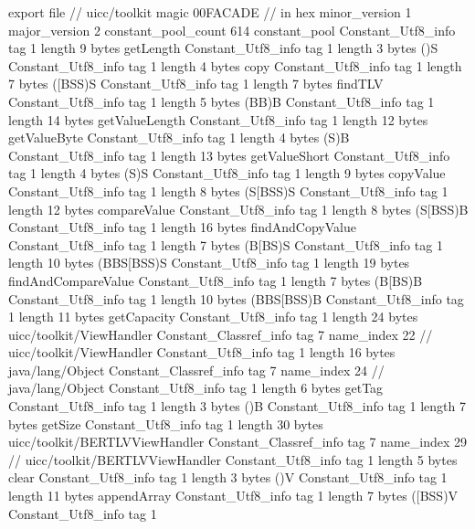 export file {		// uicc/toolkit
	magic	00FACADE		 // in hex
	minor_version	1
	major_version	2
	constant_pool_count	614
	constant_pool {
		Constant_Utf8_info {
			tag	1
			length	9
			bytes	getLength
		}
		Constant_Utf8_info {
			tag	1
			length	3
			bytes	()S
		}
		Constant_Utf8_info {
			tag	1
			length	4
			bytes	copy
		}
		Constant_Utf8_info {
			tag	1
			length	7
			bytes	([BSS)S
		}
		Constant_Utf8_info {
			tag	1
			length	7
			bytes	findTLV
		}
		Constant_Utf8_info {
			tag	1
			length	5
			bytes	(BB)B
		}
		Constant_Utf8_info {
			tag	1
			length	14
			bytes	getValueLength
		}
		Constant_Utf8_info {
			tag	1
			length	12
			bytes	getValueByte
		}
		Constant_Utf8_info {
			tag	1
			length	4
			bytes	(S)B
		}
		Constant_Utf8_info {
			tag	1
			length	13
			bytes	getValueShort
		}
		Constant_Utf8_info {
			tag	1
			length	4
			bytes	(S)S
		}
		Constant_Utf8_info {
			tag	1
			length	9
			bytes	copyValue
		}
		Constant_Utf8_info {
			tag	1
			length	8
			bytes	(S[BSS)S
		}
		Constant_Utf8_info {
			tag	1
			length	12
			bytes	compareValue
		}
		Constant_Utf8_info {
			tag	1
			length	8
			bytes	(S[BSS)B
		}
		Constant_Utf8_info {
			tag	1
			length	16
			bytes	findAndCopyValue
		}
		Constant_Utf8_info {
			tag	1
			length	7
			bytes	(B[BS)S
		}
		Constant_Utf8_info {
			tag	1
			length	10
			bytes	(BBS[BSS)S
		}
		Constant_Utf8_info {
			tag	1
			length	19
			bytes	findAndCompareValue
		}
		Constant_Utf8_info {
			tag	1
			length	7
			bytes	(B[BS)B
		}
		Constant_Utf8_info {
			tag	1
			length	10
			bytes	(BBS[BSS)B
		}
		Constant_Utf8_info {
			tag	1
			length	11
			bytes	getCapacity
		}
		Constant_Utf8_info {
			tag	1
			length	24
			bytes	uicc/toolkit/ViewHandler
		}
		Constant_Classref_info {
			tag	7
			name_index	22		// uicc/toolkit/ViewHandler
		}
		Constant_Utf8_info {
			tag	1
			length	16
			bytes	java/lang/Object
		}
		Constant_Classref_info {
			tag	7
			name_index	24		// java/lang/Object
		}
		Constant_Utf8_info {
			tag	1
			length	6
			bytes	getTag
		}
		Constant_Utf8_info {
			tag	1
			length	3
			bytes	()B
		}
		Constant_Utf8_info {
			tag	1
			length	7
			bytes	getSize
		}
		Constant_Utf8_info {
			tag	1
			length	30
			bytes	uicc/toolkit/BERTLVViewHandler
		}
		Constant_Classref_info {
			tag	7
			name_index	29		// uicc/toolkit/BERTLVViewHandler
		}
		Constant_Utf8_info {
			tag	1
			length	5
			bytes	clear
		}
		Constant_Utf8_info {
			tag	1
			length	3
			bytes	()V
		}
		Constant_Utf8_info {
			tag	1
			length	11
			bytes	appendArray
		}
		Constant_Utf8_info {
			tag	1
			length	7
			bytes	([BSS)V
		}
		Constant_Utf8_info {
			tag	1
}}}
